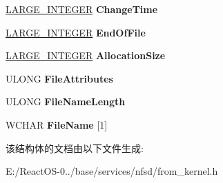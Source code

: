 \begin{DoxyCompactItemize}
\hyperlink{union___l_a_r_g_e___i_n_t_e_g_e_r}{L\+A\+R\+G\+E\+\_\+\+I\+N\+T\+E\+G\+ER} {\bfseries Change\+Time}
\item 
\mbox{\label{struct___f_i_l_e___d_i_r_e_c_t_o_r_y___i_n_f_o_a3f394b67ff82a8708f515046064f7f6f}} 
\hyperlink{union___l_a_r_g_e___i_n_t_e_g_e_r}{L\+A\+R\+G\+E\+\_\+\+I\+N\+T\+E\+G\+ER} {\bfseries End\+Of\+File}
\item 
\mbox{\label{struct___f_i_l_e___d_i_r_e_c_t_o_r_y___i_n_f_o_ab48f1886c2f9eb1ffb39f38136da1a2a}} 
\hyperlink{union___l_a_r_g_e___i_n_t_e_g_e_r}{L\+A\+R\+G\+E\+\_\+\+I\+N\+T\+E\+G\+ER} {\bfseries Allocation\+Size}
\item 
\mbox{\label{struct___f_i_l_e___d_i_r_e_c_t_o_r_y___i_n_f_o_aa0f8480493675ca987d252f03f964378}} 
U\+L\+O\+NG {\bfseries File\+Attributes}
\item 
\mbox{\label{struct___f_i_l_e___d_i_r_e_c_t_o_r_y___i_n_f_o_a28c7314d5d507fb82e9c39610a7a9fae}} 
U\+L\+O\+NG {\bfseries File\+Name\+Length}
\item 
\mbox{\label{struct___f_i_l_e___d_i_r_e_c_t_o_r_y___i_n_f_o_a9e0880536c2c82a235401ab66edfe435}} 
W\+C\+H\+AR {\bfseries File\+Name} \mbox{[}1\mbox{]}
\end{DoxyCompactItemize}


该结构体的文档由以下文件生成\+:\begin{DoxyCompactItemize}
\item 
E\+:/\+React\+O\+S-\/0../base/services/nfsd/from\+\_\+kernel.\+h\end{DoxyCompactItemize}
